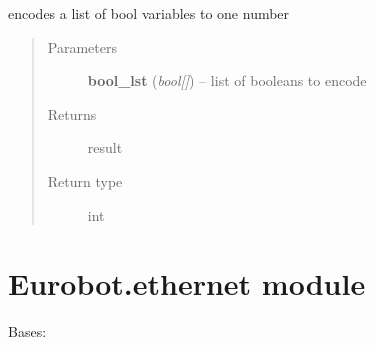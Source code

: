 \documentclass[letterpaper,10pt,english]{sphinxmanual}
\begin{document}
\begin{fulllineitems}
\label{Eurobot:Eurobot.can.encode_booleans}
encodes a list of bool variables to one number
\begin{quote}\begin{description}
\item[{Parameters}] \leavevmode
\textbf{bool\_lst} (\emph{bool{[}{]}}) -- list of booleans to encode

\item[{Returns}] \leavevmode
result

\item[{Return type}] \leavevmode
int

\end{description}\end{quote}

\end{fulllineitems}


\begin{fulllineitems}
\label{Eurobot:Eurobot.can.pack}
\end{fulllineitems}


\begin{fulllineitems}
\label{Eurobot:Eurobot.can.unpack}
\end{fulllineitems}



\section{Eurobot.ethernet module}
\label{Eurobot:module-Eurobot.ethernet}\label{Eurobot:eurobot-ethernet-module}

\begin{fulllineitems}
\label{Eurobot:Eurobot.ethernet.Client}
Bases: 

\begin{fulllineitems}
\label{Eurobot:Eurobot.ethernet.Client.connection}
\end{fulllineitems}


\end{fulllineitems}
\end{document}
